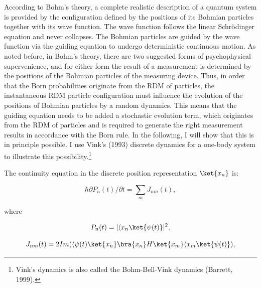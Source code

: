 According to Bohm's theory, a complete realistic description of a quantum system is provided by the configuration defined by the positions of its Bohmian particles together with its wave function. The wave function follows the linear Schr\"{o}dinger equation and never collapses. The Bohmian particles are guided by the wave function via the guiding equation to undergo deterministic continuous motion.
As noted before, in Bohm's theory, there are two suggested forms of psychophysical supervenience, and for either form the result of a measurement is determined by the positions of the Bohmian particles of the measuring device. 
Thus, in order that the Born probabilities originate from the RDM of particles, the instantaneous RDM particle configuration must influence the evolution of the positions of Bohmian particles by a random dynamics.
This means that the guiding equation needs to be added a stochastic evolution term, which originates from the RDM of particles and is required to generate the right measurement results in accordance with the Born rule.
In the following, I will show that this is in principle possible. I use Vink's (1993) discrete dynamics for a one-body system to illustrate this possibility.\footnote{Vink's dynamics is also called the Bohm-Bell-Vink dynamics (Barrett, 1999).}

The continuity equation in the discrete position representation $\ket{x_n}$ is:

\begin{equation}
\hbar \partial P_n(t)/\partial t = \sum_m J_{nm}(t),
\end{equation}

\noindent where 

\begin{equation}
P_n(t) = |\langle{x_n}\ket{\psi(t)}|^2,
\end{equation}

\begin{equation}
J_{nm}(t) = 2 Im(\langle{\psi(t)}\ket{x_n}\bra{x_n}H\ket{x_m}\langle{x_m}\ket{\psi(t)}),
\end{equation}

